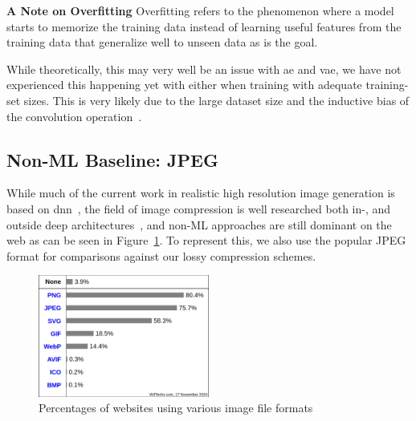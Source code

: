 \textbf{A Note on Overfitting}
Overfitting refers to the phenomenon where a model starts to memorize the training data instead of learning useful
features from the training data that generalize well to unseen data as is the goal.

While theoretically, this may very well be an issue with \ac{ae} and \ac{vae}, we have not experienced this happening
yet with either when training with adequate training-set sizes.
This is very likely due to the large dataset size and the inductive bias of the convolution operation~\cite{citationNeeded}.

\subsection{Non-ML Baseline: JPEG}\label{subsec:jpeg}
While much of the current work in realistic high resolution image generation is based on \ac{dnn}~\cite{citationNeeded},
the field of image compression is well researched both in-, and outside deep architectures~\cite{compression},
and non-ML approaches are still dominant on the web as can be seen in Figure~\ref{fig:file_formats}.
To represent this, we also use the popular JPEG format for comparisons against our lossy compression schemes.

\begin{figure}[H]
    \centering
    \includegraphics[width=0.5\textwidth]{images/formats}
    \caption{Percentages of websites using various image file formats~\cite{img_file_format}}
    \label{fig:file_formats}
\end{figure}